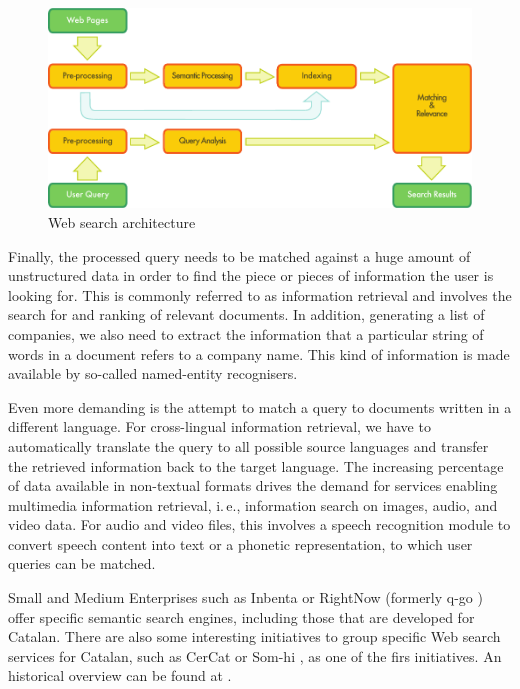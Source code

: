 \begin{multicols}{2}
\begin{figure}[htb]
  \center
  \includegraphics[width=\textwidth]{../_media/english/web_search_architecture}
  \caption{Web search architecture}
  \label{fig:websearcharch_en}
 \end{figure}

Finally, the processed query needs to be matched against a huge amount of unstructured data in order to find the piece or pieces of information the user is looking for. This is commonly referred to as information retrieval and involves the search for and ranking of relevant documents. In addition, generating a list of companies, we also need to extract the information that a particular string of words in a document refers to a company name. This kind of information is made available by so-called named-entity recognisers. 

Even more demanding is the attempt to match a query to documents written in a different language. For cross-lingual information retrieval, we have to automatically translate the query to all possible source languages and transfer the retrieved information back to the target language. The increasing percentage of data available in non-textual formats drives the demand for services enabling multimedia information retrieval, i.\,e., information search on images, audio, and video data. For audio and video files, this involves a speech recognition module to convert speech content into text or a phonetic representation, to which user queries can be matched.

Small and Medium Enterprises such as Inbenta \cite{CAT-inbenta} or RightNow (formerly q-go \cite{CAT-rightnow}) offer specific semantic search engines, including those that are developed for Catalan. There are also some interesting initiatives to group specific Web search services for Catalan, such as CerCat or Som-hi \cite{CAT-cercadors}, as one of the firs initiatives. An historical overview can be found at \cite{CAT-Resum-sobre-cercadors}.


\end{multicols}
